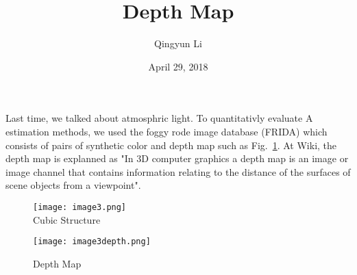 \documentclass{article}
\author{Qingyun Li}
\date{April 29, 2018}
\title{Depth Map}
\begin{document}
\maketitle
 \par Last time, we talked about atmosphric light. To quantitativly evaluate A estimation methods, we used the foggy rode image database (FRIDA) \cite{Tripathi2012Removal} which consists of pairs of synthetic color and depth map such as Fig.~\ref{depth map}. At Wiki, the depth map is explanned as "In 3D computer graphics a depth map is an image or image channel that contains information relating to the distance of the surfaces of scene objects from a viewpoint". 
\begin{figure}[htbp]
\begin{minipage}{0.5\linewidth}
\texttt{[image: image3.png]}\\
\caption{Cubic Structure}\label{original image} 
\end{minipage}
\hfill
\begin{minipage}{0.5\linewidth}
\texttt{[image: image3depth.png]}\\
\caption{Depth Map}\label{depth map}
\end{minipage} 
\end{figure}


\end{document}
